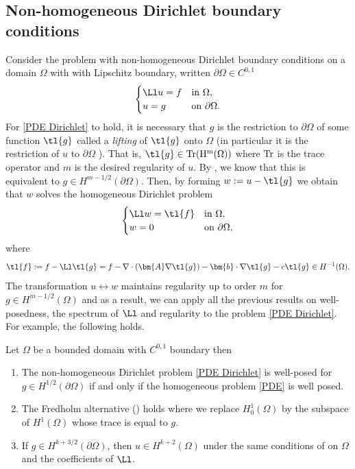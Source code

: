 \documentclass[
    a4paper,
    DIV=14,
    abstract=true,
    numbers=noenddot
]{scrartcl}
\begin{document}
\subsection{Non-homogeneous Dirichlet boundary conditions}
Consider the problem with non-homogeneous Dirichlet boundary conditions on a domain $\Omega $ with  with Lipschitz boundary, written $ \partial \Omega \in  C^{0,1}$
\begin{align}\label{PDE Dirichlet}
    \begin{cases}
        \Ll u =f & \text{in } \Omega ,          \\
        u=g      & \text{on } \partial \Omega .
    \end{cases}
\end{align}
For \eqref{PDE Dirichlet} to hold, it is necessary that $g$ is the restriction to $\partial \Omega $ of some function $\tl{g}$ called a \emph{lifting} of $\tl{g} $ onto $\Omega $   (in particular it is the restriction of  $u$ to $\partial \Omega  $ ). That is, $\tl{g}  \in \rm{Tr}(H^m(\Omega ))$ where $\rm{Tr}$ is the trace operator and $m$ is the desired regularity of $u$. By , we know that this is equivalent to $g \in H^{m-1/2}(\partial \Omega )$. Then, by forming $w:= u-\tl{g} $ we obtain that $w$ solves the homogeneous Dirichlet problem 
\begin{align*}
    \begin{cases}
        \Ll w =\tl{f} & \text{in } \Omega ,          \\
        w=0           & \text{on } \partial \Omega ,
    \end{cases}
\end{align*}
where
\begin{align*}
    \tl{f}:= f-\Ll \tl{g}= f -\nabla \cdot (\bm{A} \nabla \tl{g}) -\bm{b} \cdot \nabla \tl{g} -c \tl{g} \in H ^{-1} (\Omega ).
\end{align*}
The transformation $u \leftrightarrow w$ maintains regularity up to order $m$  for $g \in H^{m-1/2}(\Omega )$ and as a result, we can apply all the previous results on well-posedness, the spectrum of $\Ll $ and regularity to the problem \eqref{PDE Dirichlet}. For example, the following holds.
\begin{theorem}
    Let $\Omega $ be a bounded domain with $C^{0,1}$ boundary then
    \begin{enumerate}
        \item The non-homogeneous Dirichlet problem \eqref{PDE Dirichlet} is well-posed for $g \in H^{1/2}(\partial \Omega )$ if and only if the homogeneous problem \eqref{PDE} is well posed.
        \item The Fredholm alternative () holds where we replace $H_0^1(\Omega )$ by the subspace of $H^1(\Omega )$ whose trace is equal to $g$.
        \item If $g \in H^{k+3/2}(\partial \Omega )$, then $u \in H^{k+2}(\Omega )$ under the same conditions of  on $\Omega $ and the coefficients of $\Ll $.
    \end{enumerate}
\end{theorem}
\end{document}
